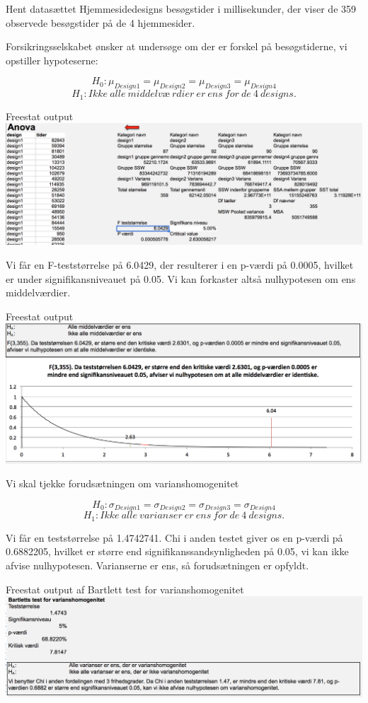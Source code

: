 \documentclass[]{book}
\begin{document}
Hent datasættet Hjemmesidedesigns besøgstider i millisekunder, der viser de 359 observede besøgstider på de 4 hjemmesider.

Forsikringsselskabet ønsker at undersøge om der er forskel på besøgstiderne, vi opstiller hypoteserne:

\[H_0:\mu_{Design 1}=\mu_{Design 2}=\mu_{Design 3}=\mu_{Design 4}\]\[H_1:Ikke\ alle\ middelvæ\ rdier\ er\ ens\ for\ de\ 4\ designs.\]

Freestat output
\includegraphics{img/anova1.png}

Vi får en F-teststørrelse på 6.0429, der resulterer i en p-værdi på 0.0005, hvilket er under signifikansniveauet på 0.05. Vi kan forkaster altså nulhypotesen om ens middelværdier.

Freestat output
\includegraphics{img/anovaFtest.png}

Vi skal tjekke forudsætningen om varianshomogenitet

\[H_0:\sigma_{Design 1}=\sigma_{Design 2}=\sigma_{Design 3}=\sigma_{Design 4}\]\[H_1:Ikke\ alle\ varianser\ er\ ens\ for\ de\ 4\ designs.\]

Vi får en teststørrelse på 1.4742741. Chi i anden testet giver os en p-værdi på 0.6882205, hvilket er større end signifikanssandsynligheden på 0.05, vi kan ikke afvise nulhypotesen. Varianserne er ens, så forudsætningen er opfyldt.

Freestat output af Bartlett test for varianshomogenitet
\includegraphics{img/Bartlett.png}
\end{document}
